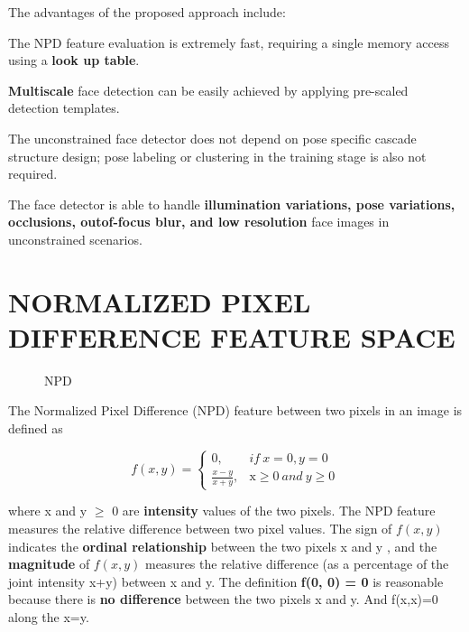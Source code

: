 \documentclass[a4paper,12pt]{article}
\begin{document}
The advantages of the proposed approach include:
\begin{compactitem}
\item The NPD feature evaluation is extremely fast, requiring a single memory access using a \textbf{look up table}.
\item \textbf{Multiscale} face detection can be easily achieved by applying pre-scaled detection templates.
\item The unconstrained face detector does not depend on pose specific cascade structure design; 
pose labeling or clustering in the training stage is also not required.
\item The face detector is able to handle \textbf{illumination variations, pose variations, occlusions, 
outof-focus blur, and low resolution} face images in unconstrained scenarios.
\end{compactitem}


\section{NORMALIZED PIXEL DIFFERENCE FEATURE SPACE}
\begin{figure}
\centering
{}
	\caption{NPD}
	\label{fig:npd}
\end{figure}

The Normalized Pixel Difference (NPD) feature between
two pixels in an image is defined as

\begin{equation}
\label{eq:NPD}
f(x,y)=
\begin{cases}
    0,					& if \ x=0,y = 0\\
    \frac{x-y}{x+y},   & \text{x} \ge 0\ and\ y \ge 0
\end{cases}
\end{equation}

where x and y $\ge$ 0 are \textbf{intensity} values of the two pixels. 
The NPD feature measures the relative difference between two pixel values. 
The sign of $f(x, y)$ indicates the \textbf{ordinal relationship} between the two pixels x and y , 
and the \textbf{magnitude} of $f(x, y)$ measures the relative difference (as a percentage of the 
joint intensity x+y) between x and y. The definition \textbf{f(0, 0) = 0} is reasonable because 
there is \textbf{no difference} between the two pixels x and y. And f(x,x)=0 along the x=y.\\
\end{document}
